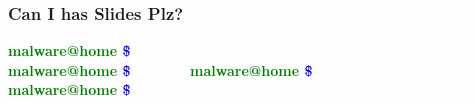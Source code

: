 \documentclass[aspectratio=169]{beamer}
\begin{document}
{
\begin{frame}
  \frametitle{Can I has Slides Plz?}
  \begin{center}
    \begin{tcolorbox}[title=terminal,colback=black]
      \begin{minipage}{0.8\textwidth}
        \small{
        \textbf{\textcolor{green}{malware@home \textcolor{blue}{\~ \$}}}
        \textcolor{white}{ git clone https://github.com/lillypad/fkks.git}
        \newline
        \textbf{\textcolor{green}{malware@home \textcolor{blue}{\~ \$}}}
        \textcolor{white}{ cd fkks/}
        \newline
        \textbf{\textcolor{green}{malware@home \textcolor{blue}{\~ \$}}}
        \textcolor{white}{ mupdf docs/index.pdf \&}
        \newline
        \textbf{\textcolor{green}{malware@home \textcolor{blue}{\~ \$}}}
        }
      \end{minipage}
    \end{tcolorbox}
  \end{center}
\end{frame}
}
\end{document}

